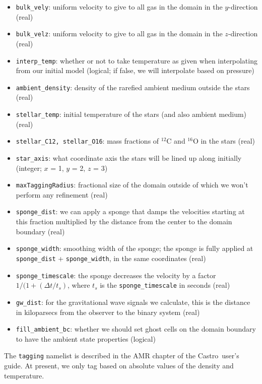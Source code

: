 \documentclass[12pt]{book}
\newcommand{\castro}{{\sf Castro}}
\begin{document}
\begin{itemize}
  \item \texttt{bulk\_vely}: uniform velocity to give to all gas in the domain in the $y$-direction (real)
  \item \texttt{bulk\_velz}: uniform velocity to give to all gas in the domain in the $z$-direction (real)
  \item \texttt{interp\_temp}: whether or not to take temperature as given when interpolating from our initial model (logical;
    if false, we will interpolate based on pressure)
  \item \texttt{ambient\_density}: density of the rarefied ambient medium outside the stars (real)
  \item \texttt{stellar\_temp}: initial temperature of the stars (and also ambient medium) (real)
  \item \texttt{stellar\_C12, stellar\_O16}: mass fractions of ${}^{12}$C and ${}^{16}$O in the stars (real)
  \item \texttt{star\_axis}: what coordinate axis the stars will be lined up along initially (integer; $x$ = 1, $y$ = 2, $z$ = 3)
  \item \texttt{maxTaggingRadius}: fractional size of the domain outside of which we won't perform any refinement (real)
  \item \texttt{sponge\_dist}: we can apply a sponge that damps the velocities starting at this fraction multiplied by the 
    distance from the center to the domain boundary (real)
  \item \texttt{sponge\_width}: smoothing width of the sponge; the sponge is fully applied at {\tt sponge\_dist} + {\tt sponge\_width},
    in the same coordinates (real)
  \item \texttt{sponge\_timescale}: the sponge decreases the velocity by a factor $1 / (1 + (\Delta t / t_s)$, where 
    $t_s$ is the {\tt sponge\_timescale} in seconds (real)
  \item \texttt{gw\_dist}: for the gravitational wave signals we calculate, this is the distance in kiloparsecs from the observer to the binary system (real)
  \item \texttt{fill\_ambient\_bc}: whether we should set ghost cells on the domain boundary to have the ambient state properties (logical)
\end{itemize}

The \texttt{tagging} namelist is described in the AMR chapter of the \castro\ user's guide. At present, we 
only tag based on absolute values of the density and temperature.
\end{document}
